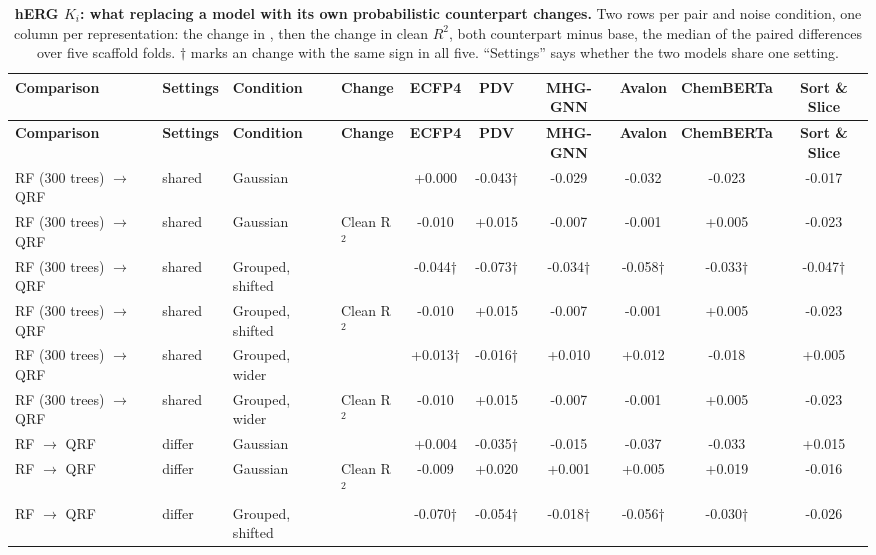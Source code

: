 \begin{landscape}
{\AFtablefont
\begin{longtable}{llllcccccc}
\caption{\textbf{hERG $K_i$: what replacing a model with its own probabilistic counterpart changes.}
Two rows per pair and noise condition, one column per representation: the change in \aucnorm{}, then the change in clean $R^2$, both counterpart minus base, the median of the paired differences over five scaffold folds. $\dagger$ marks an \aucnorm{} change with the same sign in all five. ``Settings'' says whether the two models share one setting.}
\label{app:noise:counterparts_herg}\\
\toprule
\textbf{Comparison} & \textbf{Settings} & \textbf{Condition} & \textbf{Change} & \textbf{ECFP4} & \textbf{PDV} & \textbf{MHG-GNN} & \textbf{Avalon} & \textbf{ChemBERTa} & \textbf{Sort \& Slice} \\
\midrule
\endfirsthead
\toprule
\textbf{Comparison} & \textbf{Settings} & \textbf{Condition} & \textbf{Change} & \textbf{ECFP4} & \textbf{PDV} & \textbf{MHG-GNN} & \textbf{Avalon} & \textbf{ChemBERTa} & \textbf{Sort \& Slice} \\
\midrule
\endhead
RF (300 trees) $\rightarrow$ QRF & shared & Gaussian & \aucnorm{} & +0.000 & -0.043† & -0.029 & -0.032 & -0.023 & -0.017 \\
RF (300 trees) $\rightarrow$ QRF & shared & Gaussian & Clean R$^2$ & -0.010 & +0.015 & -0.007 & -0.001 & +0.005 & -0.023 \\
RF (300 trees) $\rightarrow$ QRF & shared & Grouped, shifted & \aucnorm{} & -0.044† & -0.073† & -0.034† & -0.058† & -0.033† & -0.047† \\
RF (300 trees) $\rightarrow$ QRF & shared & Grouped, shifted & Clean R$^2$ & -0.010 & +0.015 & -0.007 & -0.001 & +0.005 & -0.023 \\
RF (300 trees) $\rightarrow$ QRF & shared & Grouped, wider & \aucnorm{} & +0.013† & -0.016† & +0.010 & +0.012 & -0.018 & +0.005 \\
RF (300 trees) $\rightarrow$ QRF & shared & Grouped, wider & Clean R$^2$ & -0.010 & +0.015 & -0.007 & -0.001 & +0.005 & -0.023 \\
RF $\rightarrow$ QRF & differ & Gaussian & \aucnorm{} & +0.004 & -0.035† & -0.015 & -0.037 & -0.033 & +0.015 \\
RF $\rightarrow$ QRF & differ & Gaussian & Clean R$^2$ & -0.009 & +0.020 & +0.001 & +0.005 & +0.019 & -0.016 \\
RF $\rightarrow$ QRF & differ & Grouped, shifted & \aucnorm{} & -0.070† & -0.054† & -0.018† & -0.056† & -0.030† & -0.026 \\

\end{longtable}}
\end{landscape}
